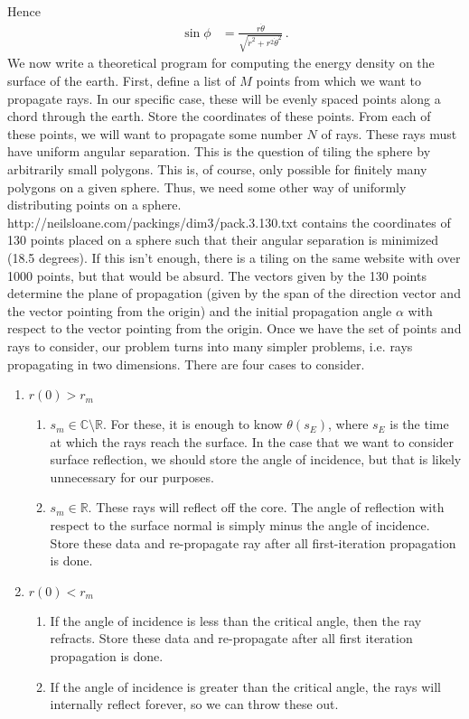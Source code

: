 \documentclass{article}
\newcommand*\R{\mathbb R}
\newcommand*\C{\mathbb C}
\newcommand*\f[2]{\frac{#1}{#2}}
\begin{document}
Hence
\begin{align}
\sin\phi&=\f{r\dot\theta}{\sqrt{\dot r^2+r^2\dot\theta^2}}\,.
\end{align}
We now write a theoretical program for computing the energy density on the surface of the earth. First, define a list of $M$ points from which we want to propagate rays. In our specific case, these will be evenly spaced points along a chord through the earth. Store the coordinates of these points. From each of these points, we will want to propagate some number $N$ of rays. These rays must have uniform angular separation. This is the question of tiling the sphere by arbitrarily small polygons. This is, of course, only possible for finitely many polygons on a given sphere. Thus, we need some other way of uniformly distributing points on a sphere. {http://neilsloane.com/packings/dim3/pack.3.130.txt} contains the coordinates of 130 points placed on a sphere such that their angular separation is minimized (18.5 degrees). If this isn't enough, there is a tiling on the same website with over 1000 points, but that would be absurd. The vectors given by the 130 points determine the plane of propagation (given by the span of the direction vector and the vector pointing from the origin) and the initial propagation angle $\alpha$ with respect to the vector pointing from the origin. Once we have the set of points and rays to consider, our problem turns into many simpler problems, i.e. rays propagating in two dimensions. There are four cases to consider.
\begin{enumerate}
\item $r(0)>r_m$
\begin{enumerate}
\item $s_m\in\C\setminus\R$. For these, it is enough to know $\theta(s_E)$, where $s_E$ is the time at which the rays reach the surface. In the case that we want to consider surface reflection, we should store the angle of incidence, but that is likely unnecessary for our purposes.
\item $s_m\in\R$. These rays will reflect off the core. The angle of reflection with respect to the surface normal is simply minus the angle of incidence. Store these data and re-propagate ray after all first-iteration propagation is done.
\end{enumerate}
\item $r(0)<r_m$
\begin{enumerate}
\item If the angle of incidence is less than the critical angle, then the ray refracts. Store these data and re-propagate after all first iteration propagation is done.
\item If the angle of incidence is greater than the critical angle, the rays will internally reflect forever, so we can throw these out.
\end{enumerate}
\end{enumerate}
\end{document}
